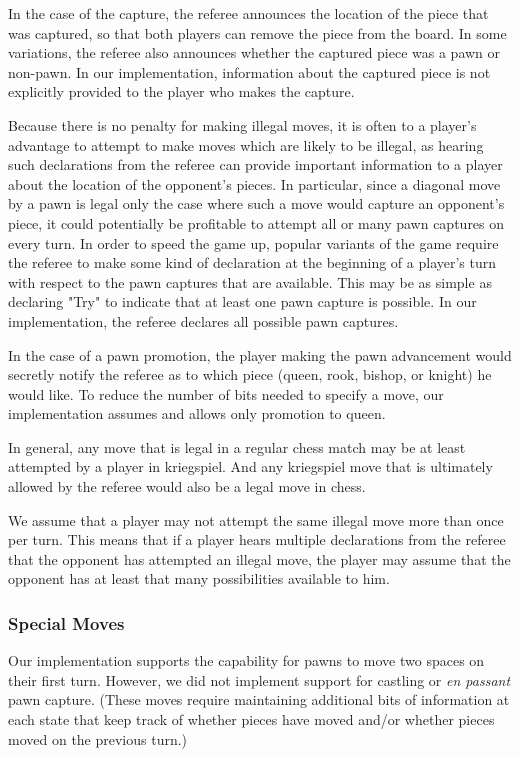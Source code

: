 \documentclass[11pt]{article}
\begin{document}
In the case of the capture, the referee announces the location of the piece that was captured, so that both players can
remove the piece from the board.  In some variations, the referee also announces whether the captured piece was a pawn
or non-pawn.  In our implementation, information about the captured piece is not explicitly provided to the player who
makes the capture.

Because there is no penalty for making illegal moves, it is often to a player's advantage to attempt to make moves which
are likely to be illegal, as hearing such declarations from the referee can provide important information to a player
about the location of the opponent's pieces.  In particular, since a diagonal move by a pawn is legal only the case
where such a move would capture an opponent's piece, it could potentially be profitable to attempt all or many pawn
captures on every turn.  In order to speed the game up, popular variants of the game require the referee to make some
kind of declaration at the beginning of a player's turn with respect to the pawn captures that are available.  This may
be as simple as declaring "Try" to indicate that at least one pawn capture is possible.  In our implementation, the
referee declares all possible pawn captures.

In the case of a pawn promotion, the player making the pawn advancement would secretly notify the referee as to which
piece (queen, rook, bishop, or knight) he would like.  To reduce the number of bits needed to specify a move, our
implementation assumes and allows only promotion to queen. 

In general, any move that is legal in a regular chess match may be at least attempted by a player in kriegspiel.  And
any kriegspiel move that is ultimately allowed by the referee would also be a legal move in chess.    

We assume that a player may not attempt the same illegal move more than once per turn.  This means that if a player
hears multiple declarations from the referee that the opponent has attempted an illegal move, the player may assume that
the opponent has at least that many possibilities available to him.

\subsubsection{Special Moves}
Our implementation supports the capability for pawns to move two spaces on their first turn.  However, we did not
implement support for castling or {\em en passant} pawn capture.  (These moves require maintaining additional bits of
information at each state that keep track of whether pieces have moved and/or whether pieces moved on the previous
turn.) 
\end{document}
